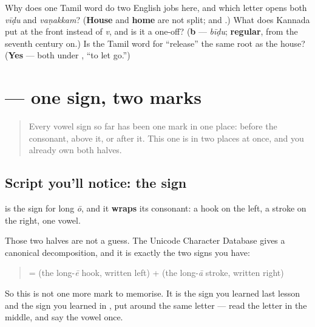 \begin{tcolorbox}[breakable,colback=teal!4,colframe=teal!35!black,title={Before you move on}]
Why does one Tamil word do two English jobs here, and which letter opens both \emph{vīḍu} and \emph{vaṇakkam}? (\textbf{House} and \textbf{home} are not split; and \textbf{}.) What does Kannada put at the front instead of \emph{v}, and is it a one-off? (\textbf{b} — \emph{bīḍu}; \textbf{regular}, from the seventh century on.) Is the Tamil word for \textquotedblleft{}release\textquotedblright{} the same root as the house? (\textbf{Yes} — both under \textbf{}, \textquotedblleft{}to let go.\textquotedblright{})
\end{tcolorbox}
\section[\texorpdfstring{\ta{போ} (pō)}{போ (pō)}]{ — one sign, two marks}

\label{lesson:TA-W15-read-po}



\begin{quote}
Every vowel sign so far has been one mark in one place: before the consonant, above it, or after it. This one is in two places at once, and you already own both halves.
\end{quote}

\subsection*{Script you'll notice: the  sign}

\textbf{} is the sign for long \emph{ō}, and it \textbf{wraps} its consonant: a hook on the left, a stroke on the right, one vowel.

Those two halves are not a guess. The Unicode Character Database gives \textbf{} a canonical decomposition, and it is exactly the two signs you have:

\begin{quote}
\textbf{} = \textbf{} (the long-\emph{ē} hook, written left) + \textbf{} (the long-\emph{ā} stroke, written right)
\end{quote}

So this is not one more mark to memorise. It is the sign you learned last lesson and the sign you learned in \textbf{}, put around the same letter — read the letter in the middle, and say the vowel once.

